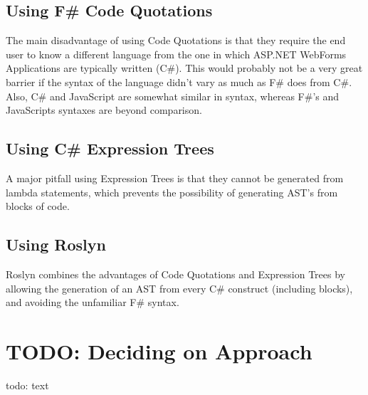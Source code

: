 		\subsection{Using F\# Code Quotations} %
		\label{sub:using_fs_code_quotations}
			The main disadvantage of using Code Quotations is that they require the end user to know a different language from the one in which ASP.NET WebForms Applications are typically written (C\#). This would probably not be a very great barrier if the syntax of the language didn't vary as much as F\# does from C\#. Also, C\# and JavaScript are somewhat similar in syntax, whereas F\#'s and JavaScripts syntaxes are beyond comparison.

		\subsection{Using C\# Expression Trees} %
		\label{sub:using_cs_expression_trees}
			A major pitfall using Expression Trees is that they cannot be generated from lambda statements, which prevents the possibility of generating AST’s from blocks of code.

		\subsection{Using Roslyn} %
		\label{sub:using_roslyn}
			Roslyn combines the advantages of Code Quotations and Expression Trees by allowing the generation of an AST from every C\# construct (including blocks), and avoiding the unfamiliar F\# syntax.


\section{TODO: Deciding on Approach} %
\label{sec:deciding_on_approach}
	todo: text


